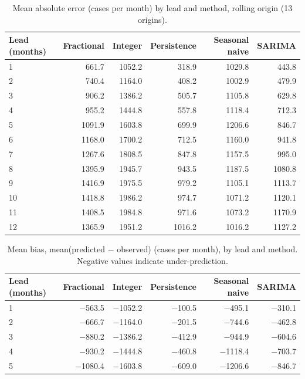 \documentclass[pdflatex,sn-mathphys-ay,lineno]{sn-jnl}
\begin{document}
\begin{appendices}
\begin{table}[htbp]
\centering
\small
\caption{Mean absolute error (cases per month) by lead and method, rolling origin (13 origins).}
\label{tab:mae_h}
\begingroup\setlength{\tabcolsep}{6pt}
\begin{tabular}{@{}lrrrrr@{}}
\toprule
Lead (months) & Fractional & Integer & Persistence & Seasonal naive & SARIMA \\
\midrule
1 & 661.7 & 1052.2 & 318.9 & 1029.8 & 443.8 \\
2 & 740.4 & 1164.0 & 408.2 & 1002.9 & 479.9 \\
3 & 906.2 & 1386.2 & 505.7 & 1105.8 & 629.8 \\
4 & 955.2 & 1444.8 & 557.8 & 1118.4 & 712.3 \\
5 & 1091.9 & 1603.8 & 699.9 & 1206.6 & 846.7 \\
6 & 1168.0 & 1700.2 & 712.5 & 1160.0 & 941.8 \\
7 & 1267.6 & 1808.5 & 847.8 & 1157.5 & 995.0 \\
8 & 1395.9 & 1945.7 & 943.5 & 1187.5 & 1080.8 \\
9 & 1416.9 & 1975.5 & 979.2 & 1105.1 & 1113.7 \\
10 & 1418.8 & 1986.2 & 974.7 & 1071.2 & 1120.1 \\
11 & 1408.5 & 1984.8 & 971.6 & 1073.2 & 1170.9 \\
12 & 1365.9 & 1951.2 & 1016.2 & 1016.2 & 1127.2 \\
\bottomrule
\end{tabular}
\endgroup
\end{table}
\begin{table}[htbp]
\centering
\small
\caption{Mean bias, mean(predicted $-$ observed) (cases per month), by lead and method. Negative values indicate under-prediction.}
\label{tab:bias_h}
\begingroup\setlength{\tabcolsep}{6pt}
\begin{tabular}{@{}lrrrrr@{}}
\toprule
Lead (months) & Fractional & Integer & Persistence & Seasonal naive & SARIMA \\
\midrule
1 & $-$563.5 & $-$1052.2 & $-$100.5 & $-$495.1 & $-$310.1 \\
2 & $-$666.7 & $-$1164.0 & $-$201.5 & $-$744.6 & $-$462.8 \\
3 & $-$880.2 & $-$1386.2 & $-$412.9 & $-$944.9 & $-$604.6 \\
4 & $-$930.2 & $-$1444.8 & $-$460.8 & $-$1118.4 & $-$703.7 \\
5 & $-$1080.4 & $-$1603.8 & $-$609.0 & $-$1206.6 & $-$846.7 \\

\end{tabular}
\end{table}
\end{appendices}
\end{document}
